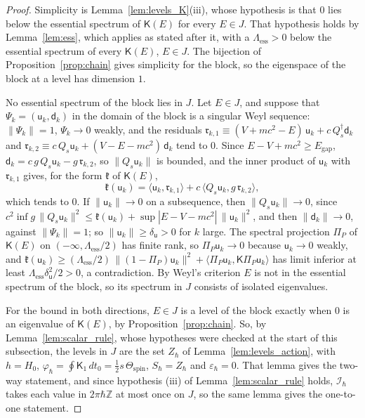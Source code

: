\documentclass[aps,prd,onecolumn,tightenlines,nofootinbib,notitlepage,11pt,floatfix]{revtex4-2}
\theoremstyle{indentedtheorem}
\begin{document}
\begin{proof}
Simplicity is Lemma~\ref{lem:levels_K}(iii), whose hypothesis is that $0$ lies below the essential spectrum of $\mathsf{K}(E)$ for every $E\in J$. That hypothesis holds by Lemma~\ref{lem:ess}, which applies as stated after it, with a $\Lambda_\text{ess}>0$ below the essential spectrum of every $\mathsf{K}(E)$, $E\in J$. The bijection of Proposition~\ref{prop:chain} gives simplicity for the block, so the eigenspace of the block at a level has dimension $1$.

No essential spectrum of the block lies in $J$. Let $E\in J$, and suppose that $\Psi_k=(\mathsf{u}_k,\mathsf{d}_k)$ in the domain of the block is a singular Weyl sequence: $\|\Psi_k\|=1$, $\Psi_k\to0$ weakly, and the residuals $\mathfrak{r}_{k,1}\equiv(V+mc^2-E)\,\mathsf{u}_k+c\,Q_s^\dagger\mathsf{d}_k$ and $\mathfrak{r}_{k,2}\equiv c\,Q_s\mathsf{u}_k+(V-E-mc^2)\,\mathsf{d}_k$ tend to $0$. Since $E-V+mc^2\geq E_\text{gap}$, $\mathsf{d}_k=c\,g\,Q_s\mathsf{u}_k-g\,\mathfrak{r}_{k,2}$, so $\|Q_s\mathsf{u}_k\|$ is bounded, and the inner product of $\mathsf{u}_k$ with $\mathfrak{r}_{k,1}$ gives, for the form $\mathfrak{k}$ of $\mathsf{K}(E)$,
\begin{equation*}
    \mathfrak{k}(\mathsf{u}_k) = \langle\mathsf{u}_k,\mathfrak{r}_{k,1}\rangle + c\,\langle Q_s\mathsf{u}_k,g\,\mathfrak{r}_{k,2}\rangle ,
\end{equation*}
which tends to $0$. If $\|\mathsf{u}_k\|\to0$ on a subsequence, then $\|Q_s\mathsf{u}_k\|\to0$, since $c^2\inf g\,\|Q_s\mathsf{u}_k\|^2\leq\mathfrak{k}(\mathsf{u}_k)+\sup|E-V-mc^2|\,\|\mathsf{u}_k\|^2$, and then $\|\mathsf{d}_k\|\to0$, against $\|\Psi_k\|=1$; so $\|\mathsf{u}_k\|\geq\delta_\mathsf{u}>0$ for $k$ large. The spectral projection $\Pi_P$ of $\mathsf{K}(E)$ on $(-\infty,\Lambda_\text{ess}/2)$ has finite rank, so $\Pi_P\mathsf{u}_k\to0$ because $\mathsf{u}_k\to0$ weakly, and $\mathfrak{k}(\mathsf{u}_k)\geq(\Lambda_\text{ess}/2)\,\|(1-\Pi_P)\mathsf{u}_k\|^2+\langle\Pi_P\mathsf{u}_k,\mathsf{K}\Pi_P\mathsf{u}_k\rangle$ has limit inferior at least $\Lambda_\text{ess}\delta_\mathsf{u}^2/2>0$, a contradiction. By Weyl's criterion $E$ is not in the essential spectrum of the block, so its spectrum in $J$ consists of isolated eigenvalues.

For the bound in both directions, $E\in J$ is a level of the block exactly when $0$ is an eigenvalue of $\mathsf{K}(E)$, by Proposition~\ref{prop:chain}. So, by Lemma~\ref{lem:scalar_rule}, whose hypotheses were checked at the start of this subsection, the levels in $J$ are the set $Z_\hbar$ of Lemma~\ref{lem:levels_action}, with $h=H_0$, $\varphi_\hbar=\oint\mathsf{K}_1\,dt_0=\tfrac{1}{2}s\,\Theta_\text{spin}$, $S_\hbar=Z_\hbar$ and $\varepsilon_\hbar=0$. That lemma gives the two-way statement, and since hypothesis (iii) of Lemma~\ref{lem:scalar_rule} holds, $\mathcal{I}_\hbar$ takes each value in $2\pi\hbar\mathbb{Z}$ at most once on $J$, so the same lemma gives the one-to-one statement.
\end{proof}
\end{document}
